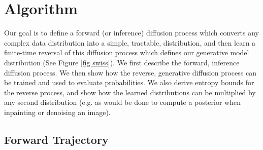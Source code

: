 \documentclass{article}
\newcommand{\mb}{\mathbf}
\newcommand{\qtrajtil}{\tilde{p}\left( \mb x^{(0\cdots T)} \right)}
\begin{document}


\section{Algorithm}

Our goal is to define a forward (or inference) diffusion process which converts any complex data distribution into a simple, tractable, distribution, and then learn a finite-time reversal of this diffusion process which defines our generative model distribution (See Figure \ref{fig swiss}). 
We first describe the forward, inference diffusion process.  
We then show how the reverse, generative diffusion process can be trained and used to evaluate probabilities.  
We also derive entropy bounds for the reverse process, and show how the learned distributions can be multiplied by any second distribution 
(e.g. as would be done to compute a posterior when inpainting or denoising an image). 

\subsection{Forward Trajectory}
\label{sec forward}
\end{document}
